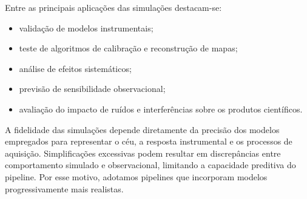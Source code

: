 Entre as principais aplicações das simulações destacam-se:

\begin{itemize}

\item validação de modelos instrumentais;

\item teste de algoritmos de calibração e reconstrução de mapas;

\item análise de efeitos sistemáticos;

\item previsão de sensibilidade observacional;

\item avaliação do impacto de ruídos e interferências sobre os produtos científicos.

\end{itemize}

A fidelidade das simulações depende diretamente da precisão dos modelos empregados para representar o céu, a resposta instrumental e os processos de aquisição. Simplificações excessivas podem resultar em discrepâncias entre comportamento simulado e observacional, limitando a capacidade preditiva do pipeline. Por esse motivo, adotamos pipelines que incorporam modelos progressivamente mais realistas.




